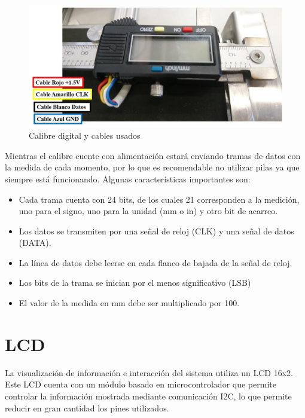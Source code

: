 \begin{figure}[hbtp]
	\centering
	\includegraphics[width=\textwidth]{02-hardware/06-calibrador.png}
	\caption{Calibre digital y cables usados}
	\label{fig:figura26}
	\end{figure}


Mientras el calibre cuente con alimentación estará enviando tramas de
datos con la medida de cada momento, por lo que es recomendable no 
utilizar pilas ya que siempre está funcionando. Algunas características 
importantes son:

\begin{itemize}
    \item Cada trama cuenta con 24 bits, de los cuales 21 corresponden
    a la medición, uno para el signo, uno para la unidad (mm o in) y otro
    bit de acarreo.
    \item Los datos se transmiten por una señal de reloj (CLK) y una señal
    de datos (DATA).
    \item La línea de datos debe leerse en cada flanco de bajada de 
    la señal de reloj.
    \item Los bits de la trama se inician por el menos significativo (LSB)
    \item El valor de la medida en mm debe ser multiplicado por 100.
\end{itemize}

\section{LCD}

La visualización de información e interacción del sistema utiliza un LCD 16x2. 
Este LCD cuenta con un módulo basado en microcontrolador que permite controlar 
la información mostrada mediante comunicación I2C, lo que permite reducir en 
gran cantidad los pines utilizados. 

